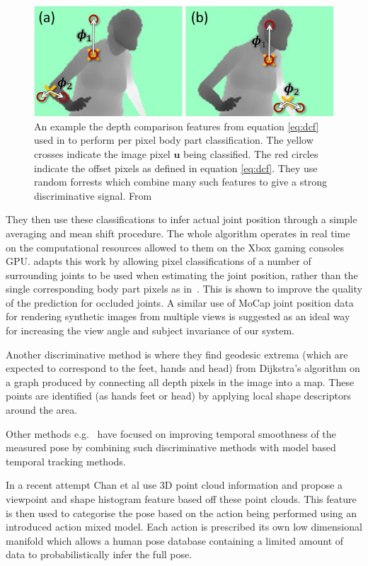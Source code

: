 \documentclass[11pt]{article} %
\begin{document}
\begin{figure}
\centering
\includegraphics*[width=0.6\linewidth,clip]{kinectFeature}
\caption{An example the depth comparison features from equation \ref{eq:dcf} used in \cite{Shotton2011} to perform per pixel body part classification. The yellow crosses indicate the image pixel $\boldsymbol{u}$ being classified. The red circles indicate the offset pixels as defined in equation \ref{eq:dcf}. They use random forrests which combine many such features to give a strong discriminative signal. From~\cite{Shotton2011} \label{fig:dcf}  } 
\end{figure}

They then use these classifications to infer actual joint position through a simple averaging and mean shift procedure. The whole algorithm operates in real time on the computational resources allowed to them on the Xbox gaming consoles GPU. \cite{Shotton2013a} adapts this work by allowing pixel classifications of a number of surrounding joints to be used when estimating the joint position, rather than the single corresponding body part pixels as in~\cite{Shotton2011}. This is shown to improve the quality of the prediction for occluded joints. A similar use of MoCap joint position data for rendering synthetic images from multiple views is suggested as an ideal way for increasing the view angle and subject invariance of our system.

Another discriminative method is \cite{Plagemann2010} where they find geodesic extrema (which are expected to correspond to the feet, hands and head) from Dijkstra’s algorithm on a graph produced by connecting all depth pixels in the image into a map. These points are identified (as hands feet or head) by applying local shape descriptors around the area. 

Other methods e.g.~\cite{Ye2011,Wei2011,Baak2011,Zhu2008} have focused on improving temporal smoothness of the measured pose by combining such discriminative methods with model based temporal tracking methods. 

In a recent attempt Chan et al \cite{Chan2014} use 3D point cloud information and propose a viewpoint and shape histogram feature based off these point clouds. This feature is then used to categorise the pose based on the action being performed using an introduced action mixed model. Each action is prescribed its own low dimensional manifold which allows a human pose database containing a limited amount of data to probabilistically infer the full pose.
\end{document}
